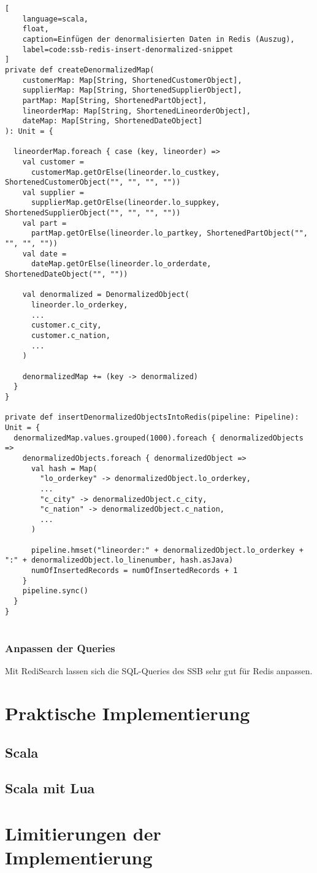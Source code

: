 \begin{lstlisting}[
    language=scala,
    float,
    caption=Einfügen der denormalisierten Daten in Redis (Auszug),
    label=code:ssb-redis-insert-denormalized-snippet
]
private def createDenormalizedMap(
    customerMap: Map[String, ShortenedCustomerObject],
    supplierMap: Map[String, ShortenedSupplierObject],
    partMap: Map[String, ShortenedPartObject],
    lineorderMap: Map[String, ShortenedLineorderObject],
    dateMap: Map[String, ShortenedDateObject]
): Unit = {

  lineorderMap.foreach { case (key, lineorder) =>
    val customer = 
      customerMap.getOrElse(lineorder.lo_custkey, ShortenedCustomerObject("", "", "", ""))
    val supplier = 
      supplierMap.getOrElse(lineorder.lo_suppkey, ShortenedSupplierObject("", "", "", ""))
    val part = 
      partMap.getOrElse(lineorder.lo_partkey, ShortenedPartObject("", "", "", ""))
    val date = 
      dateMap.getOrElse(lineorder.lo_orderdate, ShortenedDateObject("", ""))

    val denormalized = DenormalizedObject(
      lineorder.lo_orderkey,
      ...
      customer.c_city,
      customer.c_nation,
      ...
    )

    denormalizedMap += (key -> denormalized)
  }
}

private def insertDenormalizedObjectsIntoRedis(pipeline: Pipeline): Unit = {
  denormalizedMap.values.grouped(1000).foreach { denormalizedObjects =>
    denormalizedObjects.foreach { denormalizedObject =>
      val hash = Map(
        "lo_orderkey" -> denormalizedObject.lo_orderkey,
        ...
        "c_city" -> denormalizedObject.c_city,
        "c_nation" -> denormalizedObject.c_nation,
        ...
      )

      pipeline.hmset("lineorder:" + denormalizedObject.lo_orderkey + ":" + denormalizedObject.lo_linenumber, hash.asJava)
      numOfInsertedRecords = numOfInsertedRecords + 1
    }
    pipeline.sync()
  }
}


\end{lstlisting}


\subsubsection{Anpassen der Queries}
Mit RediSearch lassen sich die SQL-Queries des \acf{SSB} sehr gut für Redis anpassen.
\section{Praktische Implementierung}

\subsection{Scala}

\subsection{Scala mit Lua}

\section{Limitierungen der Implementierung}
